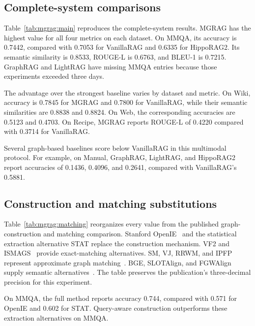 \subsection{Complete-system comparisons}

Table~\ref{tab:mgrag:main} reproduces the complete-system results. MGRAG has the highest value for all four metrics on each dataset. On MMQA, its accuracy is 0.7442, compared with 0.7053 for VanillaRAG and 0.6335 for HippoRAG2. Its semantic similarity is 0.8533, ROUGE-L is 0.6763, and BLEU-1 is 0.7215. GraphRAG and LightRAG have missing MMQA entries because those experiments exceeded three days.



The advantage over the strongest baseline varies by dataset and metric. On Wiki, accuracy is 0.7845 for MGRAG and 0.7800 for VanillaRAG, while their semantic similarities are 0.8838 and 0.8824. On Web, the corresponding accuracies are 0.5123 and 0.4703. On Recipe, MGRAG reports ROUGE-L of 0.4220 compared with 0.3714 for VanillaRAG.

Several graph-based baselines score below VanillaRAG in this multimodal protocol. For example, on Manual, GraphRAG, LightRAG, and HippoRAG2 report accuracies of 0.1436, 0.4096, and 0.2641, compared with VanillaRAG's 0.5881.

\subsection{Construction and matching substitutions}

Table~\ref{tab:mgrag:matching} reorganizes every value from the published graph-construction and matching comparison. Stanford OpenIE~\cite{mgrag-angeli2015leveraging} and the statistical extraction alternative STAT replace the construction mechanism. VF2 and ISMAGS~\cite{mgrag-cordella2004sub,mgrag-houbraken2014index} provide exact-matching alternatives. SM, VJ, RRWM, and IPFP represent approximate graph matching~\cite{mgrag-leordeanu2005spectral,mgrag-fankhauser2011speeding,mgrag-cho2010reweighted,mgrag-leordeanu2009integer}. BGE, SLOTAlign, and FGWAlign supply semantic alternatives~\cite{mgrag-bge_embedding,mgrag-tang2023robust,mgrag-tang2025fused}. The table preserves the publication's three-decimal precision for this experiment.



On MMQA, the full method reports accuracy 0.744, compared with 0.571 for OpenIE and 0.602 for STAT. Query-aware construction outperforms these extraction alternatives on MMQA.

